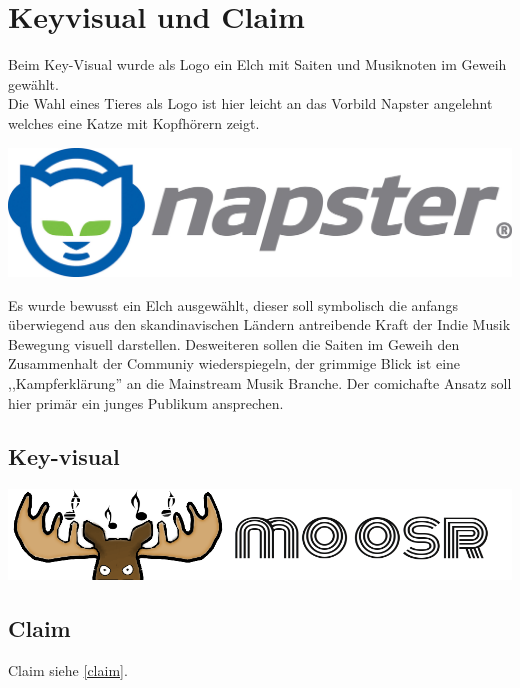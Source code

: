 \chapter{Keyvisual und Claim}

Beim Key-Visual wurde als Logo ein Elch mit Saiten und Musiknoten im Geweih
gewählt.
\\
Die Wahl eines Tieres als Logo ist hier leicht an das Vorbild Napster
angelehnt welches eine Katze mit Kopfhörern zeigt.

\begin{center}
    \includegraphics[scale=0.4]{./gfx/napster.jpeg}
\end{center}

Es wurde bewusst ein Elch ausgewählt, dieser soll symbolisch die anfangs
überwiegend aus den skandinavischen Ländern antreibende Kraft der Indie Musik
Bewegung visuell darstellen. Desweiteren sollen die Saiten im Geweih den
Zusammenhalt der Communiy wiederspiegeln, der grimmige Blick ist eine
,,Kampferklärung'' an die Mainstream Musik Branche. Der comichafte Ansatz soll
hier primär ein junges Publikum ansprechen.

\section{Key-visual}
\begin{center}
    \includegraphics[scale=0.4]{./gfx/elchlogo.png}
\end{center}
\section{Claim}
Claim siehe \ref{claim}.
